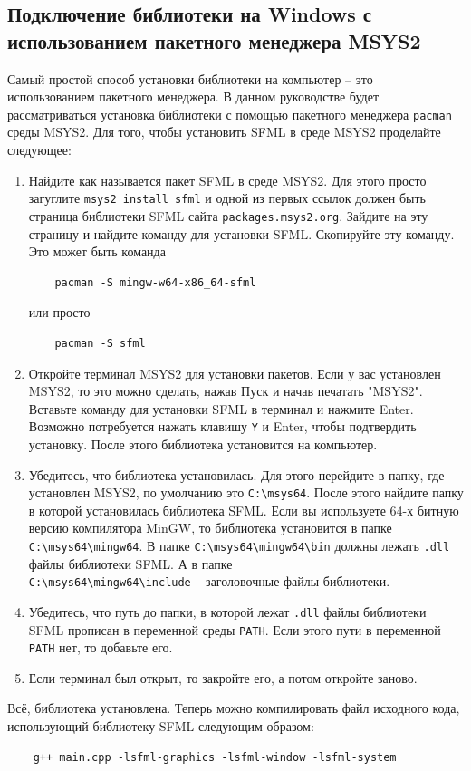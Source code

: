 \documentclass{article}
\begin{document}
\subsection*{Подключение библиотеки на Windows с использованием пакетного менеджера MSYS2}
Самый простой способ установки библиотеки на компьютер -- это использованием пакетного менеджера. В данном руководстве будет рассматриваться установка библиотеки с помощью пакетного менеджера \texttt{pacman} среды MSYS2. Для того, чтобы установить SFML в среде MSYS2 проделайте следующее:
\begin{enumerate}
\item Найдите как называется пакет SFML в среде MSYS2. Для этого просто загуглите \texttt{msys2 install sfml} и одной из первых ссылок должен быть страница библиотеки SFML сайта \texttt{packages.msys2.org}. Зайдите на эту страницу и найдите команду для установки SFML. Скопируйте эту команду. Это может быть команда
\begin{verbatim}
    pacman -S mingw-w64-x86_64-sfml
\end{verbatim}
или просто
\begin{verbatim}
    pacman -S sfml
\end{verbatim}
\item Откройте терминал MSYS2 для установки пакетов. Если у вас установлен MSYS2, то это можно сделать, нажав Пуск и начав печатать "MSYS2". Вставьте команду для установки SFML в терминал и нажмите Enter. Возможно потребуется нажать клавишу \texttt{Y} и Enter, чтобы подтвердить установку. После этого библиотека установится на компьютер. 

\item Убедитесь, что библиотека установилась. Для этого перейдите в папку, где установлен MSYS2, по умолчанию это \texttt{C:\textbackslash msys64}. После этого найдите папку в которой установилась библиотека SFML. Если вы используете 64-х битную версию компилятора MinGW, то библиотека установится в папке \texttt{C:\textbackslash msys64\textbackslash mingw64}. В папке \texttt{C:\textbackslash msys64\textbackslash mingw64\textbackslash bin} должны лежать \texttt{.dll} файлы библиотеки SFML. А в папке \\ \texttt{C:\textbackslash msys64\textbackslash mingw64\textbackslash include} -- заголовочные файлы библиотеки.

\item Убедитесь, что путь до папки, в которой лежат \texttt{.dll} файлы библиотеки SFML прописан в переменной среды \texttt{PATH}. Если этого пути в переменной \texttt{PATH} нет, то добавьте его.

\item Если терминал был открыт, то закройте его, а потом откройте заново.
\end{enumerate}
Всё, библиотека установлена. Теперь можно компилировать файл исходного кода, использующий библиотеку SFML следующим образом:
\begin{verbatim}
    g++ main.cpp -lsfml-graphics -lsfml-window -lsfml-system
\end{verbatim}
\end{document}
